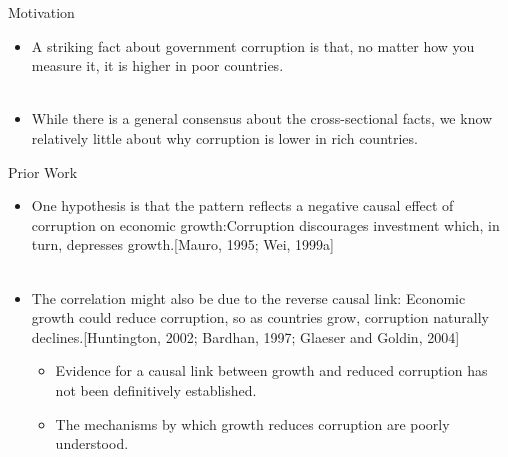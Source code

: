 \documentclass{beamer}
\begin{document}
\begin{frame}{Motivation}

\begin{itemize}
\item A striking fact about government corruption is that, no matter how you measure it, it is higher in poor countries. \\~
\item While there is a general consensus about the cross-sectional facts, we know relatively little about why corruption is lower in rich countries.
\end{itemize}

\end{frame}

\begin{frame}{Prior Work}

\begin{itemize}
\item One hypothesis is that the pattern reflects a negative causal effect of corruption on economic growth:Corruption discourages investment which, in turn, depresses growth.[Mauro, 1995; Wei, 1999a] \\~

\item The correlation might also be due to the reverse causal link: Economic growth could reduce corruption, so as countries grow, corruption naturally declines.[Huntington, 2002; Bardhan, 1997; Glaeser and Goldin, 2004]
\begin{itemize}
\item Evidence for a causal link between growth and reduced corruption has not been definitively established.
\item The mechanisms by which growth reduces corruption are poorly understood.
\end{itemize}

\end{itemize}

\end{frame}
\end{document}
